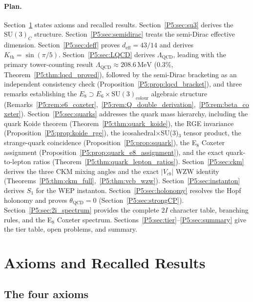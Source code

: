 \documentclass[11pt,a4paper]{article}
\theoremstyle{definition}
\theoremstyle{remark}
\newcommand{\LQCD}{\Lambda_{\mathrm{QCD}}}
\newcommand{\deff}{d_{\mathrm{eff}}}
\begin{document}
\paragraph{Plan.}
Section~\ref{P5:sec:axioms} states axioms and recalled results.
Section~\ref{P5:sec:su3} derives the $\mathrm{SU}(3)_C$ structure.
Section~\ref{P5:sec:semidirac} treats the semi-Dirac effective dimension.
Section~\ref{P5:sec:deff} proves $\deff=43/14$ and derives $K_{\mathrm{th}}=\sin(\pi/5)$.
Section~\ref{P5:sec:LQCD} derives $\LQCD$, leading with the primary tower-counting
result $\LQCD\approx208.6\,\mathrm{MeV}$ ($0.3\%$, Theorem~\ref{P5:thm:lqcd_proved}),
followed by the semi-Dirac bracketing as an independent consistency check
(Proposition~\ref{P5:prop:lqcd_bracket}), and three remarks establishing the
$E_8\supset E_6\times\mathrm{SU}(3)_{\mathrm{colour}}$ algebraic structure
(Remarks~\ref{P5:rem:e6_coxeter},~\ref{P5:rem:Q_double_derivation},~\ref{P5:rem:beta_coxeter}).
Section~\ref{P5:sec:quarks} addresses the quark mass hierarchy, including
the quark Koide theorem (Theorem~\ref{P5:thm:quark_koide}),
the RGE invariance (Proposition~\ref{P5:prop:koide_rge}),
the icosahedral$\times$SU(3)$_3$ tensor product,
the strange-quark coincidence (Proposition~\ref{P5:prop:squark}),
the E$_8$ Coxeter assignment (Proposition~\ref{P5:prop:quark_e8_assignment}),
and the exact quark-to-lepton ratios (Theorem~\ref{P5:thm:quark_lepton_ratios}).
Section~\ref{P5:sec:ckm} derives the three CKM mixing angles and the
exact $|V_{cb}|$ WZW identity (Theorems~\ref{P5:thm:ckm_full},~\ref{P5:thm:vcb_wzw}).
Section~\ref{P5:sec:instanton} derives $S_1$ for the WEP instanton.
Section~\ref{P5:sec:holonomy} resolves the Hopf holonomy and proves
$\theta_{\mathrm{QCD}}=0$ (Section~\ref{P5:sec:strongCP}).
Section~\ref{P5:sec:2i_spectrum} provides the complete $2I$ character table,
branching rules, and the E$_8$ Coxeter spectrum.
Sections~\ref{P5:sec:tier}--\ref{P5:sec:summary} give the tier table,
open problems, and summary.

\section{Axioms and Recalled Results}
\label{P5:sec:axioms}

\subsection{The four axioms}
\end{document}
